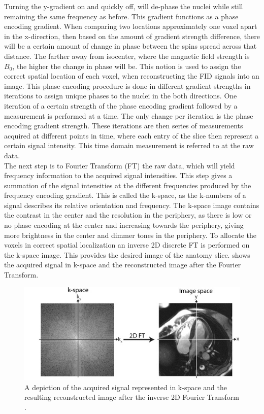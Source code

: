 Turning the y-gradient on and quickly off, will de-phase the nuclei while still remaining the same frequency as before. This gradient functions as a phase encoding gradient. When comparing two locations approximately one voxel apart in the x-direction, then based on the amount of gradient strength difference, there will be a certain amount of change in phase between the spins spread across that distance. The farther away from isocenter, where the magnetic field strength is $B_0$, the higher the change in phase will be. This notion is used to assign the correct spatial location of each voxel, when reconstructing the FID signals into an image. This phase encoding procedure is done in different gradient strengths in iterations to assign unique phases to the nuclei in the both directions. One iteration of a certain strength of the phase encoding gradient followed by a measurement is performed at a time. The only change per iteration is the phase encoding gradient strength. These iterations are then series of measurements acquired at different points in time, where each entry of the slice then represent a certain signal intensity. This time domain measurement is referred to at the raw data. \cite{Bharath2008}\\
The next step is to Fourier Transform (FT) the raw data, which will yield frequency information to the acquired signal intensities. This step gives a summation of the signal intensities at the different frequencies produced by the frequency encoding gradient. This is called the k-space, as the k-numbers of a signal describes its relative orientation and frequency. The k-space image contains the contrast in the center and the resolution in the periphery, as there is low or no phase encoding at the center and increasing towards the periphery, giving more brightness in the center and dimmer tones in the periphery. To allocate the voxels in correct spatial localization an inverse 2D discrete FT is performed on the k-space image. This provides the desired image of the anatomy slice. \cite{Bharath2008}  shows the acquired signal in k-space and the reconstructed image after the Fourier Transform. 

\begin{figure}[H]                 
	\includegraphics[width=.8\textwidth]{figures/aBackground/k_space}  
	\caption{A depiction of the acquired signal represented in k-space and the resulting reconstructed image after the inverse 2D Fourier Transform \cite{Syed2015}.}
	\label{fig:back:kspace} 
\end{figure}